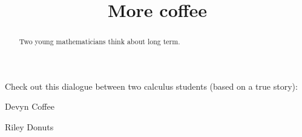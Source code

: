 \documentclass{ximera}
\title[Break-Ground:]{More coffee}
\begin{document}
\begin{abstract}
Two young mathematicians think about long term.
\end{abstract}
\maketitle

Check out this dialogue between two calculus students (based on a true
story):






\begin{dialogue}
\item[Devyn] Coffee
\item[Riley] Donuts
\end{dialogue}

\begin{problem}
\end{problem}


\end{document}
